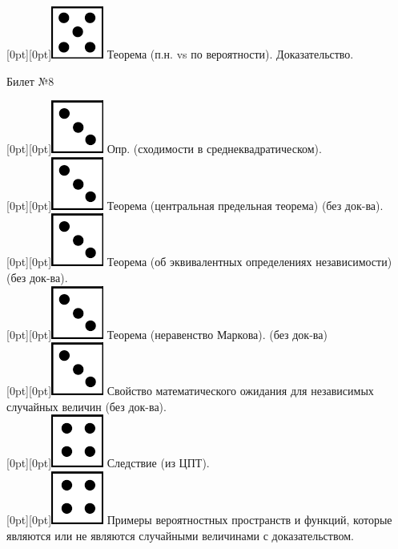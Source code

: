 \documentclass[10pt]{article}
\begin{document}
\raisebox{-1pt}[0pt][0pt]{\includegraphics[width=0.02\linewidth]{5.png}} Теорема (п.н. vs по вероятности). Доказательство. \\

\begin{center} {\Large Билет №8} \end{center} 

\raisebox{-1pt}[0pt][0pt]{\includegraphics[width=0.02\linewidth]{3.png}} Опр. (сходимости в среднеквадратическом). \\

\raisebox{-1pt}[0pt][0pt]{\includegraphics[width=0.02\linewidth]{3.png}} Теорема (центральная предельная теорема) (без док-ва). \\

\raisebox{-1pt}[0pt][0pt]{\includegraphics[width=0.02\linewidth]{3.png}} Теорема (об эквивалентных определениях независимости) (без док-ва). \\

\raisebox{-1pt}[0pt][0pt]{\includegraphics[width=0.02\linewidth]{3.png}} Теорема (неравенство Маркова). (без док-ва) \\

\raisebox{-1pt}[0pt][0pt]{\includegraphics[width=0.02\linewidth]{3.png}} Свойство  математического ожидания для независимых случайных величин (без док-ва). \\

\raisebox{-1pt}[0pt][0pt]{\includegraphics[width=0.02\linewidth]{4.png}} Следствие (из ЦПТ). \\

\raisebox{-1pt}[0pt][0pt]{\includegraphics[width=0.02\linewidth]{4.png}} Примеры вероятностных пространств и функций, которые являются или не являются случайными величинами с доказательством. \\
\end{document}
